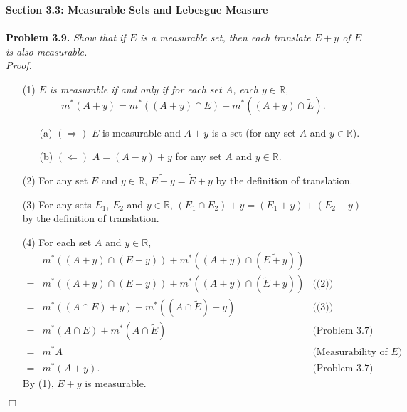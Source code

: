 \documentclass{article}
\begin{document}




\textbf{\large Section 3.3: Measurable Sets and Lebesgue Measure} \\\\



\textbf{Problem 3.9.}
\emph{Show that if $E$ is a measurable set, then each translate $E+y$ of $E$
is also measurable.} \\

\emph{Proof.}
\begin{enumerate}
\item[(1)]
\emph{$E$ is measurable if and only if
for each set $A$, each $y \in \mathbb{R}$,
$$m^{*}(A+y)
= m^{*}((A+y) \cap E) + m^{*}((A+y) \cap \widetilde{E}).$$}
  \begin{enumerate}
  \item[(a)]
  $(\Longrightarrow)$
  $E$ is measurable and
  $A+y$ is a set (for any set $A$ and $y \in \mathbb{R}$).
  \item[(b)]
  $(\Longleftarrow)$
  $A = (A-y) + y$ for any set $A$ and $y \in \mathbb{R}$.
  \end{enumerate}
\item[(2)]
For any set $E$ and $y \in \mathbb{R}$,
$\widetilde{E+y} = \widetilde{E}+y$ by the definition of translation.
\item[(3)]
For any sets $E_1$, $E_2$ and $y \in \mathbb{R}$,
$(E_1 \cap E_2)+y = (E_1+y) + (E_2+y)$ by the definition of translation.
\item[(4)]
For each set $A$ and $y \in \mathbb{R}$,
\begin{align*}
 & m^{*}((A+y) \cap (E+y)) + m^{*}((A+y) \cap (\widetilde{E+y}))
  & \\
=& m^{*}((A+y) \cap (E+y)) + m^{*}((A+y) \cap (\widetilde{E}+y))
  &\text{((2))} \\
=& m^{*}((A \cap E)+y) + m^{*}((A \cap \widetilde{E})+y)
  &\text{((3))} \\
=& m^{*}(A \cap E) + m^{*}(A \cap \widetilde{E})
  &\text{(Problem 3.7)} \\
=& m^{*}A
  &\text{(Measurability of $E$)} \\
=& m^{*}(A+y).
  &\text{(Problem 3.7)}
\end{align*}
By (1), $E+y$ is measurable.
\end{enumerate}
$\Box$ \\\\
\end{document}
